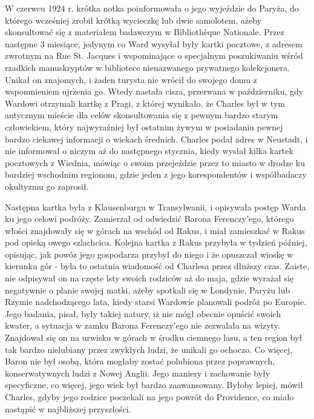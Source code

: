 W czerwcu 1924 r. krótka notka poinformowała o jego wyjeździe do Paryża, do którego wcześniej zrobił krótką wycieczkę lub dwie samolotem, ażeby skonsultować się z materiałem badawczym w Bibliothèque Nationale. Przez następne 3 miesiące, jedynym co Ward wysyłał były kartki pocztowe, z adresem zwrotnym na Rue St. Jacques i wspominające o specjalnym poszukiwaniu wśród rzadkich manuskryptów w bibliotece nienazwanego prywatnego kolekcjonera. Unikał on znajomych, i żaden turysta nie wrócił do swojego domu z wspomnieniem ujrzenia go. Wtedy nastała cisza, przerwana w październiku, gdy Wardowi otrzymali kartkę z Pragi, z której wynikało, że Charles był w tym antycznym mieście dla celów skonsultowania się z pewnym bardzo starym człowiekiem, który najwyraźniej był ostatnim żywym w posiadaniu pewnej bardzo ciekawej informacji o wiekach średnich. Charles podał adres w Neustadt, i nie informował o niczym aż do następnego stycznia, kiedy wysłał kilka kartek pocztowych z Wiednia, mówiąc o swoim przejeździe przez to miasto w drodze ku bardziej wschodnim regionom, gdzie jeden z jego korespondentów i współbadaczy okultyzmu go zaprosił.  

Następna kartka była z Klausenburgu w Transylwanii, i opisywała postęp Warda ku jego celowi podróży. Zamierzał od odwiedzić Barona Ferenczy'ego, którego włości znajdowały się w górach na wschód od Rakus, i miał zamieszkać w Rakus pod opieką owego szlachcica. Kolejna kartka z Rakus przybyła w tydzień później, opisując, jak powóz jego gospodarza przybył do niego i że opuszczał wioskę w kierunku gór - była to ostatnia wiadomość od Charlesa przez dłuższy czas. Zaiste, nie odpisywał on na częste lsty swoich rodziców aż do maja, gdzie wyrażał się negatywnie o planie swojej matki, ażeby spotkali się w Londynie, Paryżu lub Rzymie nadchodzącego lata, kiedy starsi Wardowie planowali podróż po Europie. Jego badania, pisał, były takiej natury, iż nie mógł obecnie opuścić swoich kwater, a sytuacja w zamku Barona Ferenczy'ego nie zezwalała na wizyty. Znajdował się on na urwisku w górach w środku ciemnego lasu, a ten region był tak bardzo nielubiany przez zwykłych ludzi, że unikali go ochoczo. Co więcej, Baron nie był osobą, która mogłaby zostać polubiona przez poprawnych, konserwatywnych ludzi z Nowej Anglii. Jego maniery i zachowanie były specyficzne, co więcej, jego wiek był bardzo zaawansowany. Byłoby lepiej, mówił Charles, gdyby jego rodzice poczekali na jego powrót do Providence, co miało nastąpić w najbliższej przyszłości. 

